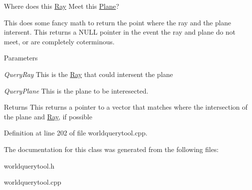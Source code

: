 Where does this \hyperlink{classphys_1_1Ray}{Ray} Meet this \hyperlink{classphys_1_1Plane}{Plane}? 

This does some fancy math to return the point where the ray and the plane intersent. This returns a NULL pointer in the event the ray and plane do not meet, or are completely coterminous. 
\begin{DoxyParams}{Parameters}
\item[{\em QueryRay}]This is the \hyperlink{classphys_1_1Ray}{Ray} that could intersent the plane \item[{\em QueryPlane}]This is the plane to be interesected. \end{DoxyParams}
\begin{DoxyReturn}{Returns}
This returns a pointer to a vector that matches where the intersection of the plane and \hyperlink{classphys_1_1Ray}{Ray}, if possible 
\end{DoxyReturn}


Definition at line 202 of file worldquerytool.cpp.



The documentation for this class was generated from the following files:\begin{DoxyCompactItemize}
\item 
worldquerytool.h\item 
worldquerytool.cpp\end{DoxyCompactItemize}
